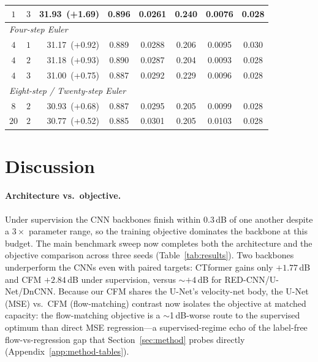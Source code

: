 \documentclass[letterpaper]{article} %
\begin{document}
\begin{table}[t]
\begin{tabular}{ccrccccc}
    $1$ & $3$ & 31.93 \,(+1.69) & 0.896 & 0.0261 & 0.240 & 0.0076 & 0.028 \\
    \midrule
    \multicolumn{8}{l}{\emph{Four-step Euler}} \\
    $4$ & $1$ & 31.17 \,(+0.92) & 0.889 & 0.0288 & 0.206 & 0.0095 & 0.030 \\
    $4$ & $2$ & 31.18 \,(+0.93) & 0.890 & 0.0287 & 0.204 & 0.0093 & 0.028 \\
    $4$ & $3$ & 31.00 \,(+0.75) & 0.887 & 0.0292 & 0.229 & 0.0096 & 0.028 \\
    \midrule
    \multicolumn{8}{l}{\emph{Eight-step / Twenty-step Euler}} \\
    $8$ & $2$ & 30.93 \,(+0.68) & 0.887 & 0.0295 & 0.205 & 0.0099 & 0.028 \\
    $20$ & $2$ & 30.77 \,(+0.52) & 0.885 & 0.0301 & 0.205 & 0.0103 & 0.028 \\
    \bottomrule
  \end{tabular}
\end{table}

\section{Discussion}

\paragraph{Architecture vs.\ objective.}
Under supervision the CNN backbones finish within $0.3$\,dB of one another
despite a $3\times$ parameter range, so the training objective dominates the
backbone at this budget.  The main benchmark sweep now completes both the
architecture and the objective comparison across three seeds
(Table~\ref{tab:results}).  Two backbones underperform the CNNs even
with paired targets: CTformer gains only $+1.77$\,dB and CFM $+2.84$\,dB under
supervision, versus $\sim{+}4$\,dB for RED-CNN/U-Net/DnCNN.  Because our CFM
shares the U-Net's velocity-net body, the U-Net (MSE) vs.\ CFM (flow-matching)
contrast now isolates the objective at matched capacity: the flow-matching
objective is a $\sim$1\,dB-worse route to the supervised optimum than direct MSE
regression---a supervised-regime echo of the label-free flow-vs-regression gap
that Section~\ref{sec:method} probes directly
(Appendix~\ref{app:method-tables}).
\end{document}
